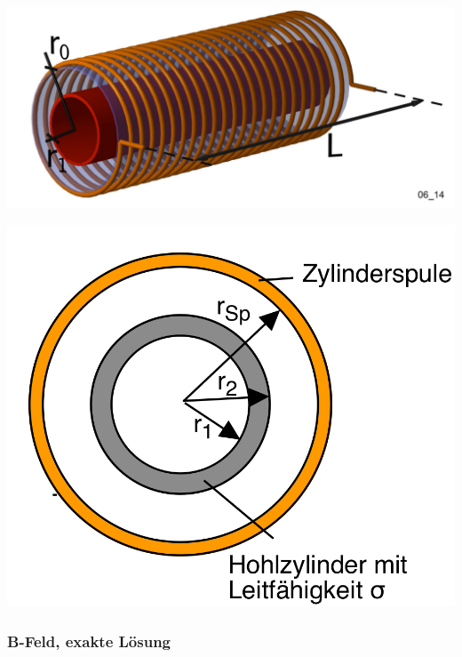 \begin{minipage}[c][][b]{0.475\textwidth}
    \centering
    \includegraphics[width=\textwidth]{images/spule-hohlzylinder.png}
\end{minipage}
\begin{minipage}[c][][b]{0.475\textwidth}
    \centering
    \includegraphics[width=\textwidth]{images/spule-hohlzylinder-querschnitt.png}
\end{minipage}


\subsubsection{B-Feld, exakte L\"osung}
\label{sec:arbgru:subsec:hohlzylinder:BExact}

